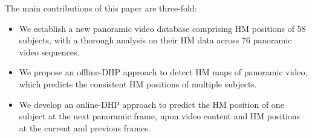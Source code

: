 \documentclass[10pt,journal,compsoc]{IEEEtran}
\begin{document}
The main contributions of this paper are three-fold:
\begin{itemize}
\item We establish a new panoramic video database comprising HM positions of 58 subjects, with a thorough analysis on their HM data across 76 panoramic video sequences.

\item We propose an offline-DHP approach to detect HM maps of panoramic video, which predicts the consistent HM positions of multiple subjects.

\item We develop an online-DHP approach to predict the HM position of one subject at the next panoramic frame, upon video content and HM positions at the current and previous frames.

\end{itemize}


\end{document}
